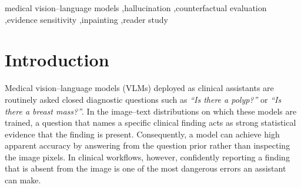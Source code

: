 \documentclass[5p,times,twocolumn,authoryear]{elsarticle}
\begin{document}
\begin{frontmatter}
\begin{keyword}
medical vision--language models \sep hallucination \sep counterfactual evaluation \sep evidence sensitivity \sep inpainting \sep reader study
\end{keyword}
\end{frontmatter}


\section{Introduction}
\label{sec:intro}
Medical vision--language models (VLMs) deployed as clinical assistants are routinely asked closed diagnostic questions such as \emph{``Is there a polyp?''} or \emph{``Is there a breast mass?''}. In the image--text distributions on which these models are trained, a question that names a specific clinical finding acts as strong statistical evidence that the finding is present. Consequently, a model can achieve high apparent accuracy by answering from the question prior rather than inspecting the image pixels. In clinical workflows, however, confidently reporting a finding that is absent from the image is one of the most dangerous errors an assistant can make.
\end{document}
